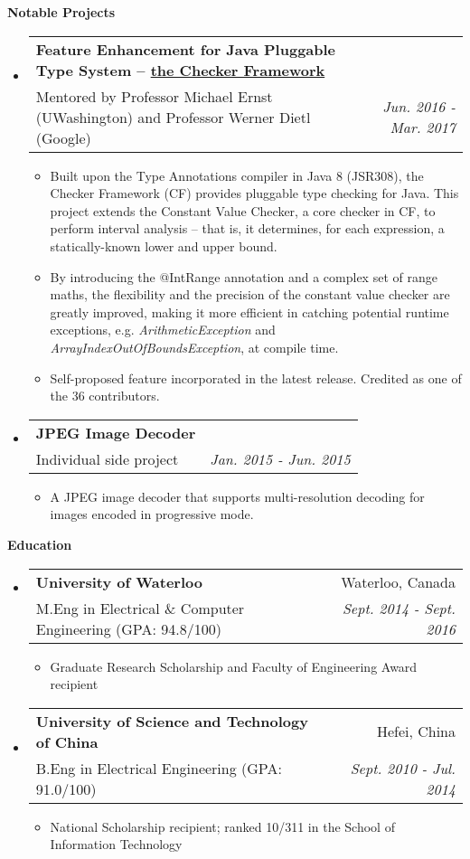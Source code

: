 \documentclass[letterpaper,10pt]{article}
\makeatletter
\newcommand{\resitem}[1]{\item #1 \vspace{-2pt}}
\newcommand{\resheading}[1]{{\large \colorbox{mygrey}{\begin{minipage}{\textwidth}{\textbf{#1 \vphantom{p\^{E}}}}\end{minipage}}}}
\newcommand{\ressubheading}[4]{
\begin{tabular*}{7.0in}{l@{\extracolsep{\fill}}r}
    \textbf{#1} & #2 \\
    #3 & \textit{#4} \\
\end{tabular*}\vspace{-6pt}}
\makeatother
\begin{document}
\resheading{Notable Projects}
\begin{itemize}
\itemsep0em
\item
	\ressubheading{Feature Enhancement for Java Pluggable Type System -- \href{https://github.com/typetools/checker-framework}{the Checker Framework}}{}{Mentored by Professor Michael Ernst (UWashington) and Professor Werner Dietl (Google)}{Jun. 2016 - Mar. 2017}
	\begin{itemize}
        \resitem{Built upon the Type Annotations compiler in Java 8 (JSR308), the Checker Framework (CF) provides pluggable type checking for Java. This project extends the Constant Value Checker, a core checker in CF, to perform interval analysis -- that is, it determines, for each expression, a statically-known lower and upper bound.}
        \resitem{By introducing the @IntRange annotation and a complex set of range maths, the flexibility and the precision of the constant value checker are greatly improved, making it more efficient in catching potential runtime exceptions, e.g. \textit{ArithmeticException} and \textit{ArrayIndexOutOfBoundsException}, at compile time.}
        \resitem{Self-proposed feature incorporated in the latest release. Credited as one of the 36 contributors.}
	\end{itemize}
\item
	\ressubheading{JPEG Image Decoder}{}{Individual side project}{Jan. 2015 - Jun. 2015}
	\begin{itemize}
		\resitem{A JPEG image decoder that supports multi-resolution decoding for images encoded in progressive mode.}
	\end{itemize}
	
\end{itemize}

\resheading{Education}
\begin{itemize}
\itemsep0em
\item
	\ressubheading{University of Waterloo}{Waterloo, Canada}{M.Eng in Electrical \& Computer Engineering (GPA: 94.8/100)}{Sept. 2014 - Sept. 2016}
	\begin{itemize}
        \resitem{Graduate Research Scholarship and Faculty of Engineering Award recipient}
	\end{itemize}
\item
	\ressubheading{University of Science and Technology of China}{Hefei, China}{B.Eng in Electrical Engineering (GPA: 91.0/100)}{Sept. 2010 - Jul. 2014}
	\begin{itemize}
        \resitem{ National Scholarship recipient; ranked 10/311 in the School of Information Technology}
	\end{itemize}

\end{itemize}
\end{document}
